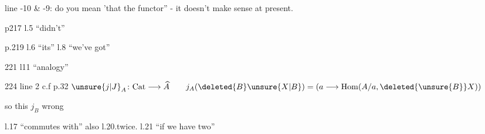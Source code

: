 line -10 \& -9: do you mean 'that the functor'' - it doesn't make sense at present.

p217 l.5 ``didn't''

p.219 l.6 ``its'' l.8 ``we've got''

221 l11 ``analogy''

224 line 2 c.f p.32 $\unsure{j|J}_A\colon\mathrm{Cat}\longrightarrow\widehat A\qquad j_A(\deleted{B}\unsure{X|B})=(a\longrightarrow\operatorname{Hom}(A/a,\deleted{\unsure{B}}X))$

so  this  $j_B$   wrong

l.17 ``commutes with'' also l.20.twice. l.21 ``if we have two''

